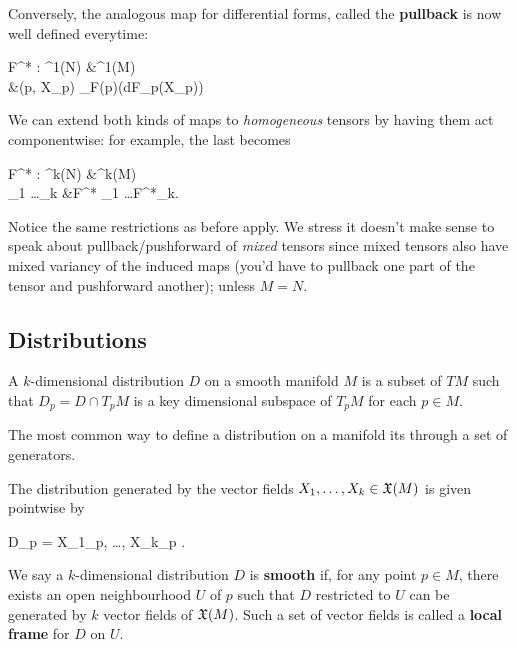\begin{construction}
\label{const:pullback}
	Conversely, the analogous map for differential forms, called the \textbf{pullback} is now well defined everytime:
	\begin{eqalign}
		F^* : \Omega^1(N) &\longto \Omega^1(M)\\
		\omega &\longmapsto (p, X_p) \mapsto \omega_{F(p)}(dF_p(X_p))
	\end{eqalign}
\end{construction}

\begin{construction}
\label{const:pb_and_pf_of_tensors}
	We can extend both kinds of maps to \emph{homogeneous} tensors by having them act componentwise: for example, the last becomes
	\begin{eqalign}
		F^* : \Omega^k(N) &\longto \Omega^k(M)\\
		\omega_1 \wedge \ldots \wedge \omega_k &\longmapsto F^* \omega_1 \wedge \ldots \wedge F^*\omega_k.
	\end{eqalign}
	Notice the same restrictions as before apply. We stress it doesn't make sense to speak about pullback/pushforward of \emph{mixed} tensors since mixed tensors also have mixed variancy of the induced maps (you'd have to pullback one part of the tensor and pushforward another); unless $M=N$.
\end{construction}

\subsection{Distributions}
\begin{definition}
	A $k$-dimensional distribution $D$ on a smooth manifold $M$ is a subset of $TM$ such that $D_p = D \cap T_pM$ is a key dimensional subspace of $T_pM$ for each $p\in M$.
\end{definition}

The most common way to define a distribution on a manifold its through a set of generators.

\begin{definition}
	The distribution generated by the vector fields $X_1, \ldots, X_k \in \mathfrak{X}(M)$ is given pointwise by
	\begin{eqalign}
		D_p = \langle X_1\vert_p, \ldots, X_k\vert_p \rangle.
	\end{eqalign}
\end{definition}

\begin{definition}
	We say a $k$-dimensional distribution $D$ is \textbf{smooth} if, for any point $p \in M$, there exists an open neighbourhood $U$ of $p$ such that $D$ restricted to $U$ can be generated by $k$ vector fields of $\mathfrak{X}(M)$. Such a set of vector fields is called a \textbf{local frame} for $D$ on $U$.
\end{definition}

